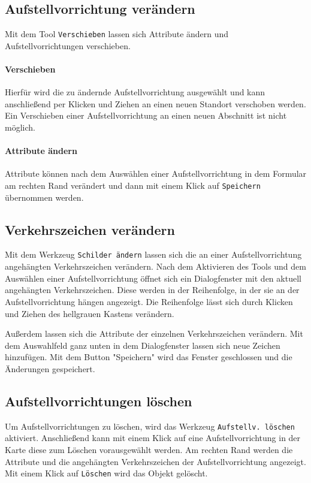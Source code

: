 \documentclass[a4paper,11pt,bibliography=totoc, listof=totoc,titlepage]{scrartcl}
\begin{document}
\subsection{Aufstellvorrichtung verändern}
Mit dem Tool \verb|Verschieben| lassen sich Attribute ändern und Aufstellvorrichtungen verschieben. 

\paragraph{Verschieben} 
Hierfür wird die zu ändernde Aufstellvorrichtung ausgewählt und kann anschließend per Klicken und Ziehen an einen neuen Standort verschoben werden. Ein Verschieben einer Aufstellvorrichtung an einen neuen Abschnitt ist nicht möglich.

\paragraph{Attribute ändern}
Attribute können nach dem Auswählen einer Aufstellvorrichtung in dem Formular am rechten Rand verändert und dann mit einem Klick auf \verb|Speichern| übernommen werden.

\subsection{Verkehrszeichen verändern}
Mit dem Werkzeug \verb|Schilder ändern| lassen sich die an einer Aufstellvorrichtung angehäng\-ten Verkehrszeichen verändern. Nach dem Aktivieren des Tools und dem  Auswählen einer Aufstellvorrichtung öffnet sich ein Dialogfenster mit den aktuell angehängten Verkehrszeichen. Diese werden in der Reihenfolge, in der sie an der Aufstellvorrichtung hängen angezeigt. Die Reihenfolge lässt sich durch Klicken und Ziehen des hellgrauen Kastens verändern.

Außerdem lassen sich die Attribute der einzelnen Verkehrszeichen verändern. Mit dem Auswahlfeld ganz unten in dem Dialogfenster lassen sich neue Zeichen hinzufügen. Mit dem Button "Speichern" wird das Fenster geschlossen und die Änderungen gespeichert.

\subsection{Aufstellvorrichtungen löschen}
Um Aufstellvorrichtungen zu löschen, wird das Werkzeug \verb|Aufstellv. löschen| aktiviert. Anschließend kann mit einem Klick auf eine Aufstellvorrichtung in der Karte diese zum Löschen vorausgewählt werden. Am rechten Rand werden die Attribute und die angehängten Verkehrszeichen der Aufstellvorrichtung angezeigt. Mit einem Klick auf \verb|Löschen| wird das Objekt gelöscht.
\end{document}
